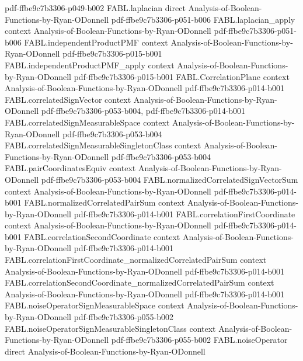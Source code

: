 \begin{theorem}
  {pdf-ffbe9c7b3306-p049-b002}
\proofstep
  {FABL.laplacian}
  {direct}
  {Analysis-of-Boolean-Functions-by-Ryan-ODonnell}
  {pdf-ffbe9c7b3306-p051-b006}
\proofstep
  {FABL.laplacian_apply}
  {context}
  {Analysis-of-Boolean-Functions-by-Ryan-ODonnell}
  {pdf-ffbe9c7b3306-p051-b006}
\proofstep
  {FABL.independentProductPMF}
  {context}
  {Analysis-of-Boolean-Functions-by-Ryan-ODonnell}
  {pdf-ffbe9c7b3306-p015-b001}
\proofstep
  {FABL.independentProductPMF_apply}
  {context}
  {Analysis-of-Boolean-Functions-by-Ryan-ODonnell}
  {pdf-ffbe9c7b3306-p015-b001}
\proofstep
  {FABL.CorrelationPlane}
  {context}
  {Analysis-of-Boolean-Functions-by-Ryan-ODonnell}
  {pdf-ffbe9c7b3306-p014-b001}
\proofstep
  {FABL.correlatedSignVector}
  {context}
  {Analysis-of-Boolean-Functions-by-Ryan-ODonnell}
  {pdf-ffbe9c7b3306-p053-b004,
    pdf-ffbe9c7b3306-p014-b001}
\proofstep
  {FABL.correlatedSignMeasurableSpace}
  {context}
  {Analysis-of-Boolean-Functions-by-Ryan-ODonnell}
  {pdf-ffbe9c7b3306-p053-b004}
\proofstep
  {FABL.correlatedSignMeasurableSingletonClass}
  {context}
  {Analysis-of-Boolean-Functions-by-Ryan-ODonnell}
  {pdf-ffbe9c7b3306-p053-b004}
\proofstep
  {FABL.pairCoordinatesEquiv}
  {context}
  {Analysis-of-Boolean-Functions-by-Ryan-ODonnell}
  {pdf-ffbe9c7b3306-p053-b004}
\proofstep
  {FABL.normalizedCorrelatedSignVectorSum}
  {context}
  {Analysis-of-Boolean-Functions-by-Ryan-ODonnell}
  {pdf-ffbe9c7b3306-p014-b001}
\proofstep
  {FABL.normalizedCorrelatedPairSum}
  {context}
  {Analysis-of-Boolean-Functions-by-Ryan-ODonnell}
  {pdf-ffbe9c7b3306-p014-b001}
\proofstep
  {FABL.correlationFirstCoordinate}
  {context}
  {Analysis-of-Boolean-Functions-by-Ryan-ODonnell}
  {pdf-ffbe9c7b3306-p014-b001}
\proofstep
  {FABL.correlationSecondCoordinate}
  {context}
  {Analysis-of-Boolean-Functions-by-Ryan-ODonnell}
  {pdf-ffbe9c7b3306-p014-b001}
\proofstep
  {FABL.correlationFirstCoordinate_normalizedCorrelatedPairSum}
  {context}
  {Analysis-of-Boolean-Functions-by-Ryan-ODonnell}
  {pdf-ffbe9c7b3306-p014-b001}
\proofstep
  {FABL.correlationSecondCoordinate_normalizedCorrelatedPairSum}
  {context}
  {Analysis-of-Boolean-Functions-by-Ryan-ODonnell}
  {pdf-ffbe9c7b3306-p014-b001}
\proofstep
  {FABL.noiseOperatorSignMeasurableSpace}
  {context}
  {Analysis-of-Boolean-Functions-by-Ryan-ODonnell}
  {pdf-ffbe9c7b3306-p055-b002}
\proofstep
  {FABL.noiseOperatorSignMeasurableSingletonClass}
  {context}
  {Analysis-of-Boolean-Functions-by-Ryan-ODonnell}
  {pdf-ffbe9c7b3306-p055-b002}
\proofstep
  {FABL.noiseOperator}
  {direct}
  {Analysis-of-Boolean-Functions-by-Ryan-ODonnell}

\end{theorem}
